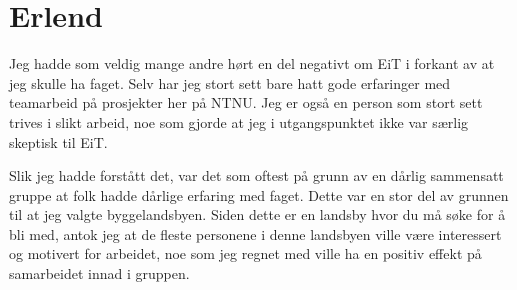 \section{Erlend}
Jeg hadde som veldig mange andre hørt en del negativt om EiT i forkant av at jeg skulle ha faget. Selv har jeg stort sett bare hatt gode erfaringer med teamarbeid på prosjekter her på NTNU. Jeg er også en person som stort sett trives i slikt arbeid, noe som gjorde at jeg i utgangspunktet ikke var særlig skeptisk til EiT. 

Slik jeg hadde forstått det, var det som oftest på grunn av en dårlig sammensatt gruppe at folk hadde dårlige erfaring med faget. Dette var en stor del av grunnen til at jeg valgte byggelandsbyen. Siden dette er en landsby hvor du må søke for å bli med, antok jeg at de fleste personene i denne landsbyen ville være interessert og motivert for arbeidet, noe som jeg regnet med ville ha en positiv effekt på samarbeidet innad i gruppen. 